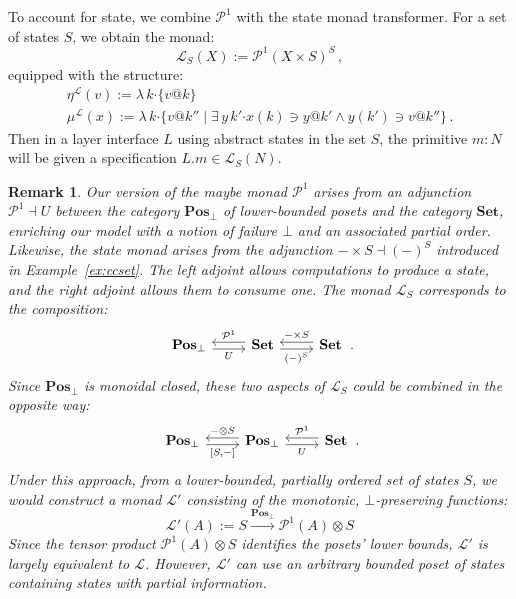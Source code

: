 \documentclass[11pt,oneside]{book}
\newtheorem{remark}[theorem]{Remark}
\theoremstyle{definition}
\newcommand{\bdot}{\boldsymbol{\cdot}}
\begin{document}
To account for state,
we combine $\mathcal{P}^1$ with the state monad transformer.
For a set of states $S$,
we obtain the monad:
\[
  \mathcal{L}_S(X) :=
    \mathcal{P}^1(X \times S)^S \,,
\]
equipped with the structure:
\begin{gather*}
  \eta^\mathcal{L}(v) :=
    \lambda \, k \bdot \{ v@k \} \\
  \mu^\mathcal{L}(x) :=
    \lambda \, k \bdot \{ v@k'' \mid
      \exists \, y \, k' \bdot x(k) \ni y@k' \wedge y(k') \ni v@k'' \}
  \,.
\end{gather*}
Then in a layer interface $L$
using abstract states in the set $S$,
the primitive $m \mathbin: N$
will be given a specification
$L.m \in \mathcal{L}_S(N)$.

\begin{remark}
Our version of the \emph{maybe} monad $\mathcal{P}^1$
arises from an adjunction $\mathcal{P}^1 \dashv U$
between the category $\mathbf{Pos}_\bot$
of lower-bounded posets
and the category $\mathbf{Set}$,
enriching our model with a notion of failure $\bot$
and an associated partial order.
Likewise,
the state monad arises from the adjunction
$- \times S \dashv (-)^S$
introduced in Example~\ref{ex:ccset}.
The left adjoint allows computations to produce a state,
and the right adjoint allows them to consume one.
The monad $\mathcal{L}_S$ corresponds to the composition:
\[
  \begin{tikzcd}
    \mathbf{Pos}_\bot
      \ar[r, "U"', shift right] &
    \mathbf{Set}
      \ar[l, "\mathcal{P}^1"', shift right]
      \ar[r, "(-)^S"', shift right] &
    \mathbf{Set}
      \ar[l, "- \times S"', shift right]
   \end{tikzcd}
  \,.
\]
Since $\mathbf{Pos}_\bot$ is monoidal closed,
these two aspects of $\mathcal{L}_S$
could be combined in the opposite way:
\[
  \begin{tikzcd}
    \mathbf{Pos}_\bot
      \ar[r, "{[S, {-}]}"', shift right] &
    \mathbf{Pos}_\bot
      \ar[l, "{-} \otimes S"', shift right]
      \ar[r, "U"', shift right] &
    \mathbf{Set}
      \ar[l, "\mathcal{P}^1"', shift right]
   \end{tikzcd}
  \,.
\]
Under this approach,
from a \emph{lower-bounded, partially ordered}
set of states $S$, we would construct a monad $\mathcal{L}'$
consisting of the \emph{monotonic, $\bot$-preserving} functions:
\[
  \mathcal{L}'(A) := S \xrightarrow{\mathbf{Pos}_\bot} \mathcal{P}^1(A) \otimes S
\]
Since the tensor product $\mathcal{P}^1(A) \otimes S$ identifies
the posets' lower bounds,
$\mathcal{L}'$ is largely equivalent to $\mathcal{L}$.
However, $\mathcal{L}'$ can use an arbitrary bounded poset of states
containing states with partial information.
\end{remark}
\end{document}
